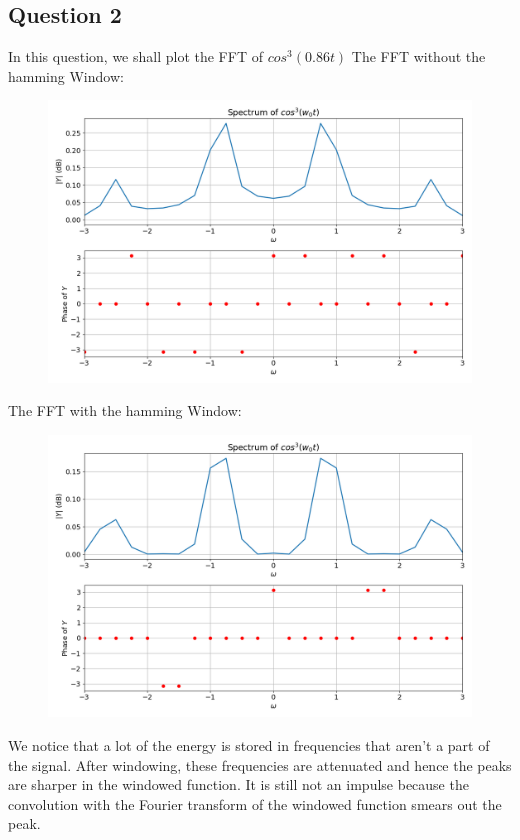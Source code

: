 \documentclass[11pt, a4paper]{article}
\begin{document}
\subsection{Question 2}

In this question, we shall plot the FFT of $cos^3(0.86t)$
The FFT without the hamming Window:
\begin{figure}[!tbh]
\centering
\includegraphics[scale=0.4]{plots/cos^3_wo.png}
\label{fig:8}
\end{figure}


The FFT with the hamming Window:
\begin{figure}[!tbh]
\centering
\includegraphics[scale=0.4]{plots/cos^3_with.png}
\label{fig:9}
\end{figure}

We notice that a lot of the energy is stored in frequencies that aren't a part of the signal. 
After windowing, these frequencies are attenuated and hence the peaks are sharper in the windowed function. 
It is still not an impulse because the convolution with the Fourier transform of the windowed function smears out the peak.
\end{document}
